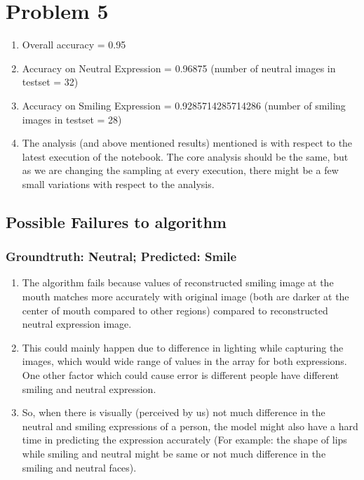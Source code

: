 \documentclass[11pt,letterpaper]{article}
\begin{document}
\section*{Problem 5}
\begin{enumerate}
    [label=$\bullet$]
    \item Overall accuracy = 0.95
    \item Accuracy on Neutral Expression = 0.96875 (number of neutral images in testset = 32)
    \item Accuracy on Smiling Expression = 0.9285714285714286 (number of smiling images in testset = 28)
    \item The analysis (and above mentioned results) mentioned is with respect to the latest execution of the notebook. The core analysis should be the same, but as we are changing the sampling at every execution, there might be a few small variations with respect to the analysis.
\end{enumerate}
\subsection*{Possible Failures to algorithm}
\subsubsection*{Groundtruth: Neutral; Predicted: Smile}
\begin{enumerate}
    [label=$\bullet$]
    \item The algorithm fails because values of reconstructed smiling image at the mouth matches more accurately with original image (both are darker at the center of mouth compared to other regions) compared to reconstructed neutral expression image. 
    \item This could mainly happen due to difference in lighting while capturing the images, which would wide range of values in the array for both expressions. One other factor which could cause error is different people have different smiling and neutral expression. 
    \item So, when there is visually (perceived by us) not much difference in the neutral and smiling expressions of a person, the model might also have a hard time in predicting the expression accurately (For example: the shape of lips while smiling and neutral might be same or not much difference in the smiling and neutral faces).
\end{enumerate}
\end{document}
